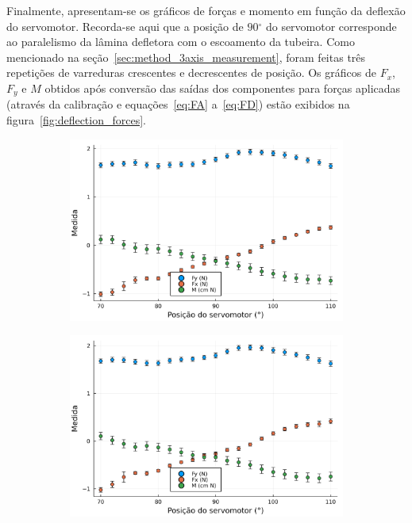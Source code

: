 Finalmente, apresentam-se os gráficos de forças e momento em função da deflexão do servomotor. Recorda-se aqui que a posição de \(90\mathrm{^{\circ}}\) do servomotor corresponde ao paralelismo da lâmina defletora com o escoamento da tubeira. Como mencionado na seção~\ref{sec:method_3axis_measurement}, foram feitas três repetições de varreduras crescentes e decrescentes de posição. Os gráficos de \(F_x\), \(F_y\) e \(M\) obtidos após conversão das saídas dos componentes para forças aplicadas (através da calibração e equações~\ref{eq:FA} a~\ref{eq:FD}) estão exibidos na figura~\ref{fig:deflection_forces}.

\begin{figure}[htbp]
    \centering
    \begin{subfigure}{0.49\textwidth}
        \includegraphics[width=\textwidth]{img/results/exp7_5bar_70_a_110.png}
    \end{subfigure}
    \begin{subfigure}{0.49\textwidth}
        \includegraphics[width=\textwidth]{img/results/exp8_5bar_110_a_70.png}

\end{subfigure}
\end{figure}
